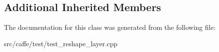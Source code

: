 \subsection*{Additional Inherited Members}


The documentation for this class was generated from the following file\+:\begin{DoxyCompactItemize}
\item 
src/caffe/test/test\+\_\+reshape\+\_\+layer.\+cpp\end{DoxyCompactItemize}
